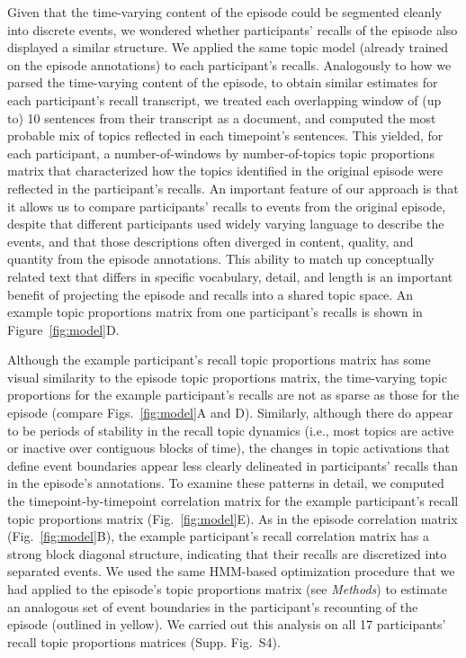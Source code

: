 \documentclass[10pt]{article}
\newcommand{\corrmats}{S4}
\begin{document}
Given that the time-varying content of the episode could be segmented cleanly into discrete events, we wondered whether participants' recalls of the episode also displayed a similar structure.  We applied the same topic model (already trained on the episode annotations) to each participant's recalls.  Analogously to how we parsed the time-varying content of the episode, to obtain similar estimates for each participant's recall transcript, we treated each overlapping  window of (up to) 10 sentences from their transcript as a document, and computed the most probable mix of topics reflected in each timepoint's sentences.  This yielded, for each participant, a number-of-windows by number-of-topics topic proportions matrix that characterized how the topics identified in the original episode were reflected in the participant's recalls.  An important feature of our approach is that it allows us to compare participants' recalls to events from the original episode, despite that different participants used widely varying language to describe the events, and that those descriptions often diverged in content, quality, and quantity from the episode annotations.  This ability to match up conceptually related text that differs in specific vocabulary, detail, and length is an important benefit of projecting the episode and recalls into a shared topic space.  An example topic proportions matrix from one participant's recalls is shown in Figure~\ref{fig:model}D.

Although the example participant's recall topic proportions matrix has some visual similarity to the episode topic proportions matrix, the time-varying topic proportions for the example participant's recalls are not as sparse as those for the episode (compare Figs.~\ref{fig:model}A and D).  Similarly, although there do appear to be periods of stability in the recall topic dynamics (i.e., most topics are active or inactive over contiguous blocks of time), the changes in topic activations that define event boundaries appear less clearly delineated in participants' recalls than in the episode's annotations.  To examine these patterns in detail, we computed the timepoint-by-timepoint correlation matrix for the example participant's recall topic proportions matrix (Fig.~\ref{fig:model}E).  As in the episode correlation matrix (Fig.~\ref{fig:model}B), the example participant's recall correlation matrix has a strong block diagonal structure, indicating that their recalls are discretized into separated events.  We used the same HMM-based optimization procedure that we had applied to the episode's topic proportions matrix (see \textit{Methods}) to estimate an analogous set of event boundaries in the participant's recounting of the episode (outlined in yellow).  We carried out this analysis on all 17 participants' recall topic proportions matrices (Supp. Fig.~\corrmats).
\end{document}
